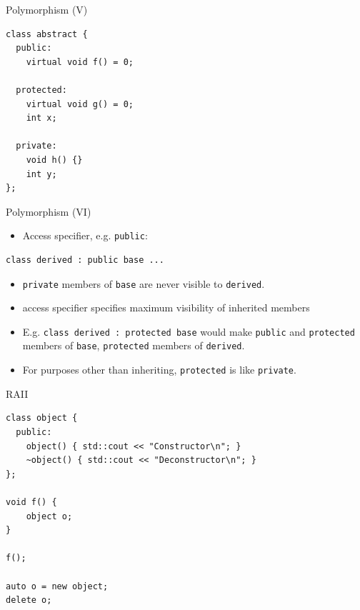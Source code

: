 \documentclass[10pt]{beamer}
\begin{document}
\begin{frame}[fragile,label={sec:org3d1d0e9}]{Polymorphism (V)}
 \begin{verbatim}
class abstract {
  public:
    virtual void f() = 0;

  protected:
    virtual void g() = 0;
    int x;

  private:
    void h() {}
    int y;
};
\end{verbatim}
\end{frame}

\begin{frame}[fragile,label={sec:orgb848068}]{Polymorphism (VI)}
 \begin{itemize}
\item Access specifier, e.g. \texttt{public}:
\end{itemize}
\begin{verbatim}
class derived : public base ...
\end{verbatim}
\begin{itemize}
\item \texttt{private} members of \texttt{base} are never visible to \texttt{derived}.
\item access specifier specifies maximum visibility of inherited members
\end{itemize}
\begin{itemize}
\item E.g.
\texttt{class derived : protected base} would make \texttt{public} and \texttt{protected}
members of \texttt{base}, \texttt{protected} members of \texttt{derived}.
\item For purposes other than inheriting, \texttt{protected} is like \texttt{private}.
\end{itemize}
\end{frame}

\begin{frame}[fragile,label={sec:org968fed3}]{RAII}
 \begin{verbatim}
class object {
  public:
    object() { std::cout << "Constructor\n"; }
    ~object() { std::cout << "Deconstructor\n"; }
};

void f() {
    object o;
}

f();

auto o = new object;
delete o;
\end{verbatim}
\end{frame}
\end{document}
